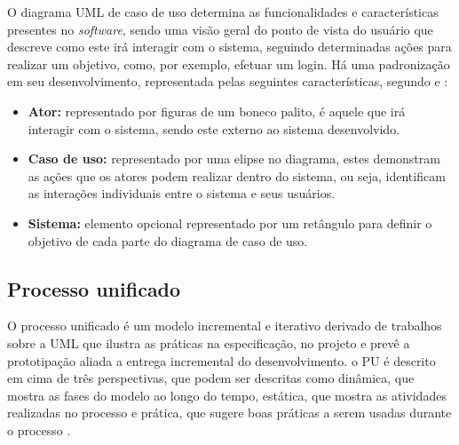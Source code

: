 O diagrama UML de caso de uso determina as funcionalidades e características presentes no \textit{software}, sendo uma visão geral do ponto de vista do usuário que descreve como este irá interagir com o sistema, seguindo determinadas ações para realizar um objetivo, como, por exemplo, efetuar um login. Há uma padronização em seu desenvolvimento, representada pelas seguintes características, segundo  e :
\begin{itemize}
    \item \textbf{Ator: }representado por figuras de um boneco palito, é aquele que irá interagir com o sistema, sendo este externo ao sistema desenvolvido.
    \item \textbf{Caso de uso: }representado por uma elipse no diagrama, estes demonstram as ações que os atores podem realizar dentro do sistema, ou seja, identificam as interações individuais entre o sistema e seus usuários. 
    \item \textbf{Sistema: }elemento opcional representado por um retângulo para definir o objetivo de cada parte do diagrama de caso de uso. 
\end{itemize}

\subsection{Processo unificado}
O processo unificado é um modelo incremental e iterativo derivado de trabalhos sobre a UML que ilustra as práticas na especificação, no projeto e prevê a prototipação aliada a entrega incremental do desenvolvimento. o PU é descrito em cima de três perspectivas, que podem ser descritas como dinâmica, que mostra as fases do modelo ao longo do tempo, estática, que mostra as atividades realizadas no processo e prática, que sugere boas práticas a serem usadas durante o processo \cite{SOMMERVILE}.

